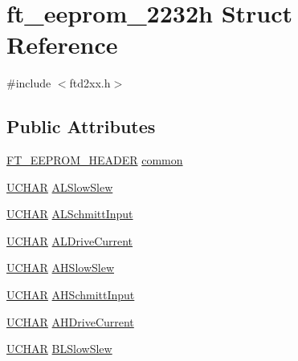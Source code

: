 \hypertarget{structft__eeprom__2232h}{}\section{ft\+\_\+eeprom\+\_\+2232h Struct Reference}
\label{structft__eeprom__2232h}


{\ttfamily \#include $<$ftd2xx.\+h$>$}

\subsection*{Public Attributes}
\begin{DoxyCompactItemize}
\item 
\hyperlink{LALUsbMLx64_2include_2ftd2xx_8h_ad5a6f519cd67a403fd8742756462394e}{F\+T\+\_\+\+E\+E\+P\+R\+O\+M\+\_\+\+H\+E\+A\+D\+ER} \hyperlink{structft__eeprom__2232h_a9b818fef5106306f0fb8456979164d4e}{common}
\item 
\hyperlink{CatCaloProto40MHz_2inc_2WinTypes_8h_a4f4bb67531a9bf6f0b9c6ad76aeba587}{U\+C\+H\+AR} \hyperlink{structft__eeprom__2232h_a202255f5052272a7807e17fd5d580438}{A\+L\+Slow\+Slew}
\item 
\hyperlink{CatCaloProto40MHz_2inc_2WinTypes_8h_a4f4bb67531a9bf6f0b9c6ad76aeba587}{U\+C\+H\+AR} \hyperlink{structft__eeprom__2232h_aabf6af90bb51868803bb93b09f45d6fd}{A\+L\+Schmitt\+Input}
\item 
\hyperlink{CatCaloProto40MHz_2inc_2WinTypes_8h_a4f4bb67531a9bf6f0b9c6ad76aeba587}{U\+C\+H\+AR} \hyperlink{structft__eeprom__2232h_add083043190baacddfb71891e65f0e35}{A\+L\+Drive\+Current}
\item 
\hyperlink{CatCaloProto40MHz_2inc_2WinTypes_8h_a4f4bb67531a9bf6f0b9c6ad76aeba587}{U\+C\+H\+AR} \hyperlink{structft__eeprom__2232h_acfcd2fc032788785109a3f6cf48541a9}{A\+H\+Slow\+Slew}
\item 
\hyperlink{CatCaloProto40MHz_2inc_2WinTypes_8h_a4f4bb67531a9bf6f0b9c6ad76aeba587}{U\+C\+H\+AR} \hyperlink{structft__eeprom__2232h_abeb4cedf9e0a7ff67cba78e20d1c9c53}{A\+H\+Schmitt\+Input}
\item 
\hyperlink{CatCaloProto40MHz_2inc_2WinTypes_8h_a4f4bb67531a9bf6f0b9c6ad76aeba587}{U\+C\+H\+AR} \hyperlink{structft__eeprom__2232h_a66a0e83f79b8ab08e2b7ae6dad6a6ab9}{A\+H\+Drive\+Current}
\item 
\hyperlink{CatCaloProto40MHz_2inc_2WinTypes_8h_a4f4bb67531a9bf6f0b9c6ad76aeba587}{U\+C\+H\+AR} \hyperlink{structft__eeprom__2232h_ac04377c073041676bf56e25152572952}{B\+L\+Slow\+Slew}

\end{DoxyCompactItemize}
